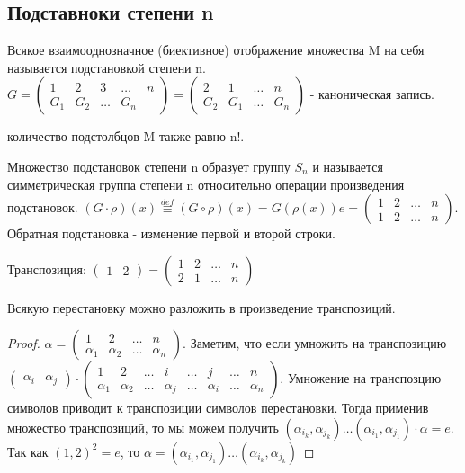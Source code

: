 \subsection{Подставноки степени n}

\begin{definition}
	Всякое взаимооднозначное (биективное) отображение множества M на себя называется подстановкой степени n. \(G = \begin{pmatrix}
		1 & 2 & 3 & \ldots & n \\
		G_1 & G_2 & \ldots & G_n
	\end{pmatrix} = \begin{pmatrix}
	2 & 1 & \ldots & n \\ 
	G_2 & G_1 & \ldots & G_n 
	\end{pmatrix}\) - каноническая запись.
\end{definition}
количество подстолбцов M также равно n!.
\begin{proposition}
	Множество подстановок степени n образует группу \(S_n\) и называется симметрическая группа степени n относительно операции произведения подстановок. \((G\cdot \rho)(x) \overset{def}{\equiv} (G\circ\rho)(x) = G(\rho(x)) e= \begin{pmatrix}
	1 & 2 & \ldots & n \\
	1 & 2 & \ldots & n
	\end{pmatrix}\). Обратная подстановка - изменение первой и второй строки.
\end{proposition}
Транспозиция: \(\begin{pmatrix}
	1 & 2
\end{pmatrix} = \begin{pmatrix}
1 & 2 & \ldots & n \\
2 & 1 & \ldots & n
\end{pmatrix}\)
\begin{proposition}
	Всякую перестановку можно разложить в произведение транспозиций.
\end{proposition}
\begin{proof}
	\(\alpha = \begin{pmatrix}
		1 & 2 & \ldots & n \\
		\alpha_1 & \alpha_2 & \ldots & \alpha_n
	\end{pmatrix}\). Заметим, что если умножить на транспозицию \(\begin{pmatrix}
	\alpha_i & \alpha_j
	\end{pmatrix}\cdot\begin{pmatrix}
	1 & 2 & \ldots & i & \ldots & j & \ldots & n \\
	\alpha_1 & \alpha_2 & \ldots & \alpha_j & \ldots & \alpha_i & \ldots & \alpha_n
	\end{pmatrix}\). Умножение на транспозцию символов приводит к транспозиции символов перестановки. Тогда применив множество транспозиций, то мы можем получить \((\alpha_{i_k}, \alpha_{j_k})\ldots(\alpha_{i_1}, \alpha_{j_1})\cdot\alpha = e\). Так как \((1, 2)^2 = e\), то \(\alpha = (\alpha_{i_1}, \alpha_{j_1})\ldots (\alpha_{i_k}, \alpha_{j_k})\)
\end{proof}
